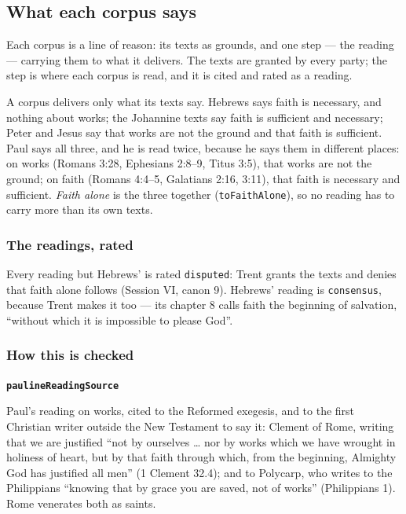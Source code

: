 \documentclass[11pt,paper=\testimonypaper,DIV=13,parskip=false]{scrartcl}
\begin{document}
\subsection*{What each corpus says}
Each corpus is a line of reason: its texts as grounds, and one step — the reading — carrying them to what it delivers. The texts are granted by every party; the step is where each corpus is read, and it is cited and rated as a reading.

A corpus delivers only what its texts say. Hebrews says faith is necessary, and nothing about works; the Johannine texts say faith is sufficient and necessary; Peter and Jesus say that works are not the ground and that faith is sufficient. Paul says all three, and he is read twice, because he says them in different places: on works (Romans 3:28, Ephesians 2:8–9, Titus 3:5), that works are not the ground; on faith (Romans 4:4–5, Galatians 2:16, 3:11), that faith is necessary and sufficient. \emph{Faith alone} is the three together (\texttt{to\allowbreak{}Faith\allowbreak{}Alone}), so no reading has to carry more than its own texts.

\subsubsection*{The readings, rated}
Every reading but Hebrews’ is rated \texttt{disputed}: Trent grants the texts and denies that faith alone follows (Session VI, canon 9). Hebrews’ reading is \texttt{consensus}, because Trent makes it too — its chapter 8 calls faith the beginning of salvation, “without which it is impossible to please God”.

\subsubsection*{How this is checked}
\par\medskip\noindent\textbf{\texttt{pauline\allowbreak{}Reading\allowbreak{}Source}}\par\nobreak\noindent
Paul’s reading on works, cited to the Reformed exegesis, and to the first Christian writer outside the New Testament to say it: Clement of Rome, writing that we are justified “not by ourselves … nor by works which we have wrought in holiness of heart, but by that faith through which, from the beginning, Almighty God has justified all men” (1 Clement 32.4); and to Polycarp, who writes to the Philippians “knowing that by grace you are saved, not of works” (Philippians 1). Rome venerates both as saints.
\end{document}
